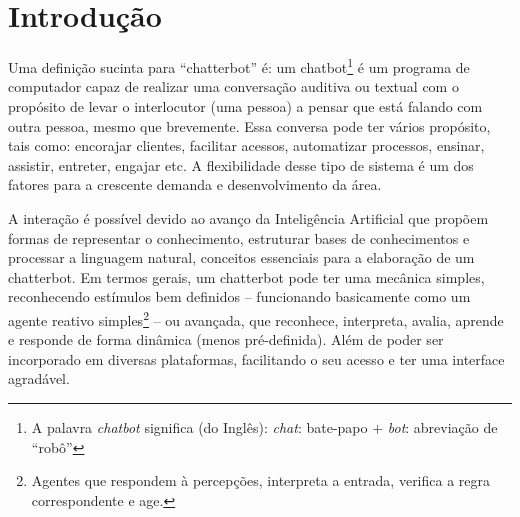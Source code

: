 \section{Introdução}\label{sec:introducao} %
Uma definição sucinta para ``chatterbot'' é: um chatbot\footnote{A palavra \emph{chatbot} significa (do Inglês): \emph{chat}: bate-papo + \emph{bot}: abreviação de ``robô''} é um programa de computador capaz de realizar uma conversação auditiva ou textual \cite{blog_chatterbot} com o propósito de levar o interlocutor (uma pessoa) a pensar que está falando com outra pessoa, mesmo que brevemente.
Essa conversa pode ter vários propósito, tais como: encorajar clientes, facilitar acessos, automatizar processos, ensinar, assistir, entreter, engajar etc. A flexibilidade desse tipo de sistema é um dos fatores para a crescente demanda e desenvolvimento da área.

A interação é possível devido ao avanço da Inteligência Artificial que propõem formas de representar o conhecimento, estruturar bases de conhecimentos e processar a linguagem natural, conceitos essenciais para a elaboração de um chatterbot.
Em termos gerais, um chatterbot pode ter uma mecânica simples, reconhecendo estímulos bem definidos -- funcionando basicamente como um agente reativo simples\footnote{Agentes que respondem à percepções, interpreta a entrada, verifica a regra correspondente e age.\cite{wiki_agente_inteligente}} -- ou avançada, que reconhece, interpreta, avalia, aprende e responde de forma dinâmica (menos pré-definida). Além de poder ser incorporado em diversas plataformas, facilitando o seu acesso e ter uma interface agradável.